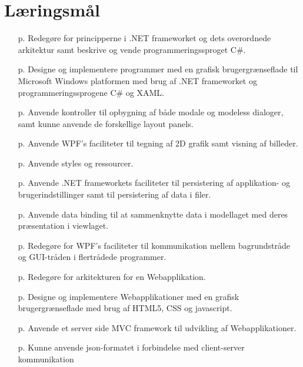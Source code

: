 \section{Læringsmål}

\begin{itemize}
	\item [p.\pageref{sec:spm1}] Redegøre for principperne i .NET frameworket og dets overordnede arkitektur samt beskrive og vende programmeringssproget C\#.

	\item [p.\pageref{sec:spm2}] Designe og implementere programmer med en grafisk brugergrænseflade til Microsoft Windows platformen med brug af .NET frameworket og programmeringssprogene C\# og XAML.

	\item [p.\pageref{sec:spm3}] Anvende kontroller til opbygning af både modale og modeless dialoger, samt kunne anvende de forskellige layout panels.

	\item [p.\pageref{sec:spm4}] Anvende WPF's faciliteter til tegning af 2D grafik samt visning af billeder.
	
	\item [p.\pageref{sec:spm5}] Anvende styles og ressourcer.
	
	\item [p.\pageref{sec:spm6}] Anvende .NET frameworkets faciliteter til persistering af applikation- og brugerindstillinger samt til persistering af data i filer.
	
	\item [p.\pageref{sec:spm7}] Anvende data binding til at sammenknytte data i modellaget med deres præsentation i viewlaget.
	
	\item [p.\pageref{sec:spm8}] Redegøre for WPF's faciliteter til kommunikation mellem bagrundstråde og GUI-tråden i flertrådede programmer.
	
	\item [p.\pageref{sec:spm9}] Redegøre for arkitekturen for en Webapplikation. 
	
	\item [p.\pageref{sec:spm10}] Designe og implementere Webapplikationer med en grafisk brugergrænseflade med brug af HTML5, CSS og javascript.
	
	\item [p.\pageref{sec:spm12}] Anvende et server side MVC framework til udvikling af Webapplikationer.
	
	\item [p.\pageref{sec:spm11}] Kunne anvende json-formatet i forbindelse med client-server kommunikation	
\end{itemize}